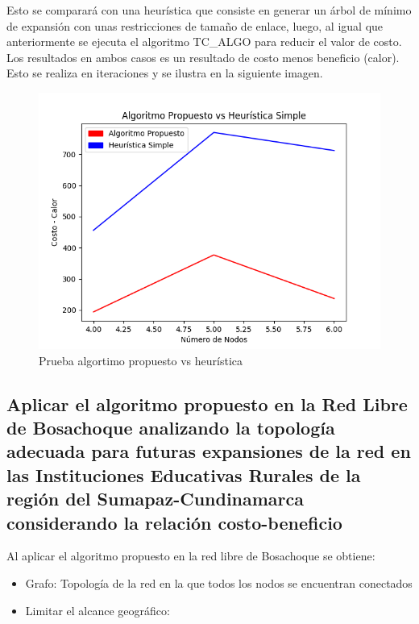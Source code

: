 \documentclass[]{article}
\begin{document}
Esto se comparará con una heurística que consiste en generar un árbol de
mínimo de expansión con unas restricciones de tamaño de enlace, luego,
al igual que anteriormente se ejecuta el algoritmo TC\_ALGO para reducir
el valor de costo. Los resultados en ambos casos es un resultado de
costo menos beneficio (calor). Esto se realiza en iteraciones y se
ilustra en la siguiente imagen.

\begin{figure}
\centering
\includegraphics{pruebas.png}
\caption{Prueba algortimo propuesto vs heurística}
\end{figure}

\subsection{Aplicar el algoritmo propuesto en la Red Libre de Bosachoque
analizando la topología adecuada para futuras expansiones de la red en
las Instituciones Educativas Rurales de la región del
Sumapaz-Cundinamarca considerando la relación
costo-beneficio}\label{aplicar-el-algoritmo-propuesto-en-la-red-libre-de-bosachoque-analizando-la-topologuxeda-adecuada-para-futuras-expansiones-de-la-red-en-las-instituciones-educativas-rurales-de-la-regiuxf3n-del-sumapaz-cundinamarca-considerando-la-relaciuxf3n-costo-beneficio}

Al aplicar el algoritmo propuesto en la red libre de Bosachoque se
obtiene:

\begin{itemize}
\item
  Grafo: Topología de la red en la que todos los nodos se encuentran
  conectados
\item
  Limitar el alcance geográfico:
\end{itemize}
\end{document}
